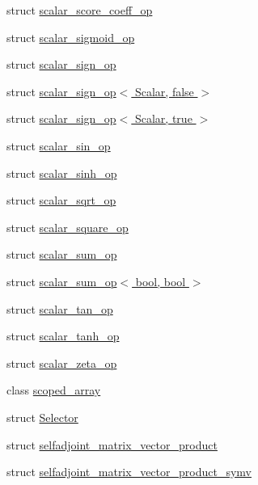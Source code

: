 \begin{DoxyCompactItemize}
\item 
struct \hyperlink{struct_eigen_1_1internal_1_1scalar__score__coeff__op}{scalar\+\_\+score\+\_\+coeff\+\_\+op}
\item 
struct \hyperlink{struct_eigen_1_1internal_1_1scalar__sigmoid__op}{scalar\+\_\+sigmoid\+\_\+op}
\item 
struct \hyperlink{struct_eigen_1_1internal_1_1scalar__sign__op}{scalar\+\_\+sign\+\_\+op}
\item 
struct \hyperlink{struct_eigen_1_1internal_1_1scalar__sign__op_3_01_scalar_00_01false_01_4}{scalar\+\_\+sign\+\_\+op$<$ Scalar, false $>$}
\item 
struct \hyperlink{struct_eigen_1_1internal_1_1scalar__sign__op_3_01_scalar_00_01true_01_4}{scalar\+\_\+sign\+\_\+op$<$ Scalar, true $>$}
\item 
struct \hyperlink{struct_eigen_1_1internal_1_1scalar__sin__op}{scalar\+\_\+sin\+\_\+op}
\item 
struct \hyperlink{struct_eigen_1_1internal_1_1scalar__sinh__op}{scalar\+\_\+sinh\+\_\+op}
\item 
struct \hyperlink{struct_eigen_1_1internal_1_1scalar__sqrt__op}{scalar\+\_\+sqrt\+\_\+op}
\item 
struct \hyperlink{struct_eigen_1_1internal_1_1scalar__square__op}{scalar\+\_\+square\+\_\+op}
\item 
struct \hyperlink{struct_eigen_1_1internal_1_1scalar__sum__op}{scalar\+\_\+sum\+\_\+op}
\item 
struct \hyperlink{struct_eigen_1_1internal_1_1scalar__sum__op_3_01bool_00_01bool_01_4}{scalar\+\_\+sum\+\_\+op$<$ bool, bool $>$}
\item 
struct \hyperlink{struct_eigen_1_1internal_1_1scalar__tan__op}{scalar\+\_\+tan\+\_\+op}
\item 
struct \hyperlink{struct_eigen_1_1internal_1_1scalar__tanh__op}{scalar\+\_\+tanh\+\_\+op}
\item 
struct \hyperlink{struct_eigen_1_1internal_1_1scalar__zeta__op}{scalar\+\_\+zeta\+\_\+op}
\item 
class \hyperlink{class_eigen_1_1internal_1_1scoped__array}{scoped\+\_\+array}
\item 
struct \hyperlink{struct_eigen_1_1internal_1_1_selector}{Selector}
\item 
struct \hyperlink{struct_eigen_1_1internal_1_1selfadjoint__matrix__vector__product}{selfadjoint\+\_\+matrix\+\_\+vector\+\_\+product}
\item 
struct \hyperlink{struct_eigen_1_1internal_1_1selfadjoint__matrix__vector__product__symv}{selfadjoint\+\_\+matrix\+\_\+vector\+\_\+product\+\_\+symv}

\end{DoxyCompactItemize}
